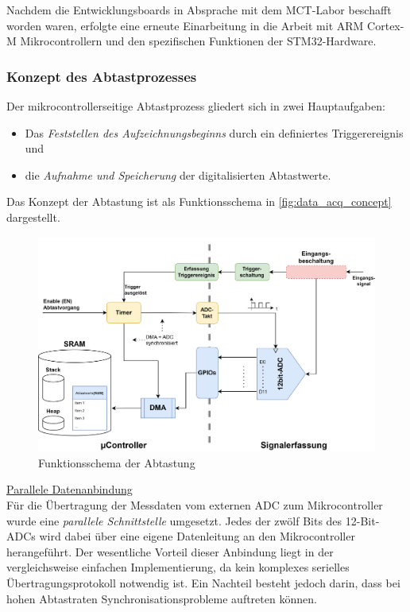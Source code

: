 \documentclass[a4paper, portrait, 12pt]{scrartcl} %
\begin{document}
Nachdem die Entwicklungsboards in Absprache mit dem MCT-Labor beschafft worden waren, erfolgte eine erneute Einarbeitung in die Arbeit mit ARM Cortex-M Mikrocontrollern und den spezifischen Funktionen der STM32-Hardware.
\pagebreak

\subsubsection{Konzept des Abtastprozesses}
Der mikrocontrollerseitige Abtastprozess gliedert sich in zwei Hauptaufgaben:

\begin{itemize}
	\item Das \emph{Feststellen des Aufzeichnungsbeginns} durch ein definiertes Triggerereignis und

	\item die \emph{Aufnahme und Speicherung} der digitalisierten Abtastwerte.
\end{itemize}

Das Konzept der Abtastung ist als Funktionsschema in \autoref{fig:data_acq_concept} dargestellt.

\begin{figure}[H]
	\centering
    \includegraphics[scale=0.12]{Funktionsschema_Datenerfassung.png} 
	\caption{Funktionsschema der Abtastung}
	\label{fig:data_acq_concept}
\end{figure}

\underline{Parallele Datenanbindung}\\
Für die Übertragung der Messdaten vom externen ADC zum Mikrocontroller wurde eine \emph{parallele Schnittstelle} umgesetzt. Jedes der zwölf Bits des 12-Bit-ADCs wird dabei über eine eigene Datenleitung an den Mikrocontroller herangeführt. Der wesentliche Vorteil dieser Anbindung liegt in der vergleichsweise einfachen Implementierung, da kein komplexes serielles Übertragungsprotokoll notwendig ist. Ein Nachteil besteht jedoch darin, dass bei hohen Abtastraten Synchronisationsprobleme auftreten können.\\
\end{document}
